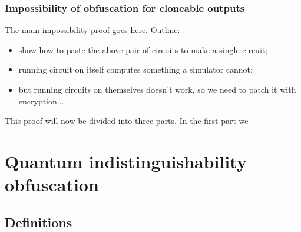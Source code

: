 \documentclass[11pt]{article}
\numberwithin{equation}{section}
\begin{document}
%
%

\subsubsection{Impossibility of obfuscation for cloneable outputs}

The main impossibility proof goes here. Outline:

\begin{itemize}
\item show how to paste the above pair of circuits to make a single circuit;
\item running circuit on itself computes something a simulator cannot;
\item but running circuits on themselves doesn't work, so we need to patch it with encryption...
\end{itemize}
This proof will now be divided into three parts.  In the first part we 




\section{Quantum indistinguishability obfuscation}\label{sec:indistinguishability}

\subsection{Definitions}
\end{document}
